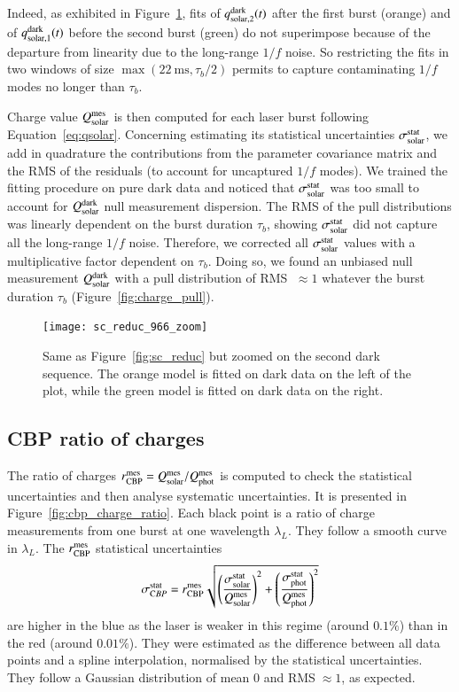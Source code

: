 Indeed, as exhibited in Figure~\ref{fig:sc_reduc_zoom}, fits of $q_{\rm solar,2}^{\rm dark}(t)$ after the first burst (orange) and of $q_{\rm solar,1}^{\rm dark}(t)$ before the second burst (green) do not superimpose because of the departure from linearity due to the long-range $1/f$ noise. So restricting the fits in two windows of size $\max(\SI{22}{\ms},\tau_b/2)$ permits to capture contaminating $1/f$ modes no longer than $\tau_b$. 

Charge value $Q_{\mathrm{solar}}^{\mathrm{mes}}$ is then computed for each laser burst following Equation~\ref{eq:qsolar}. Concerning estimating its statistical uncertainties $\sigma_{\mathrm{solar}}^{\mathrm{stat}}$, we add in quadrature the contributions from the parameter covariance matrix and the RMS of the residuals (to account for uncaptured $1/f$ modes). We trained the fitting procedure on pure dark data and noticed that $\sigma_{\mathrm{solar}}^{\mathrm{stat}}$ was too small to account for $Q_{\mathrm{solar}}^{\rm dark}$ null measurement dispersion. The RMS of the pull distributions was linearly dependent on the burst duration $\tau_b$, showing $\sigma_{\mathrm{solar}}^{\mathrm{stat}}$ did not capture all the long-range $1/f$ noise. Therefore, we corrected all $\sigma_{\mathrm{solar}}^{\mathrm{stat}}$ values with a multiplicative factor dependent on $\tau_b$. Doing so, we found an unbiased null measurement $Q_{\mathrm{solar}}^{\rm dark}$ with a pull distribution of RMS $\;\approx 1$ whatever the burst duration $\tau_b$ (Figure~\ref{fig:charge_pull}). 

\begin{figure}[!h]
\centering
\texttt{[image: sc\_reduc\_966\_zoom]}
\caption{Same as Figure~\ref{fig:sc_reduc} but zoomed on the second dark sequence. The orange model is fitted on dark data on the left of the plot, while the green model is fitted on dark data on the right.}\label{fig:sc_reduc_zoom}
\end{figure}


\subsection{CBP ratio of charges}

The ratio of charges $r_{\rm CBP}^{\rm mes} = Q_{\mathrm{solar}}^{\mathrm{mes}}/Q_{\mathrm{phot}}^{\mathrm{mes}}$ is computed to check the statistical uncertainties and then analyse systematic uncertainties. It is presented in Figure~\ref{fig:cbp_charge_ratio}. Each black point is a ratio of charge measurements from one burst at one wavelength $\lambda_L$. They follow a smooth curve in $\lambda_L$. The $r_{\rm CBP}^{\rm mes}$ statistical uncertainties 
\begin{equation}
    \sigma_{\mathrm CBP}^{\rm stat} = r_{\rm CBP}^{\rm mes} \sqrt{\left(\frac{\sigma_{\mathrm{solar}}^{\mathrm{stat}}}{Q_{\mathrm{solar}}^{\mathrm{mes}}}\right)^2 +  \left(\frac{\sigma_{\mathrm{phot}}^{\mathrm{stat}}}{Q_{\mathrm{phot}}^{\mathrm{mes}}}\right)^2 }
\end{equation}
are higher in the blue as the laser is weaker in this regime (around $0.1\%$) than in the red (around $0.01\%$). They were estimated as the difference between all data points and a spline interpolation, normalised by the statistical uncertainties. They follow a Gaussian distribution of mean 0 and RMS$\;\approx 1$, as expected. 

